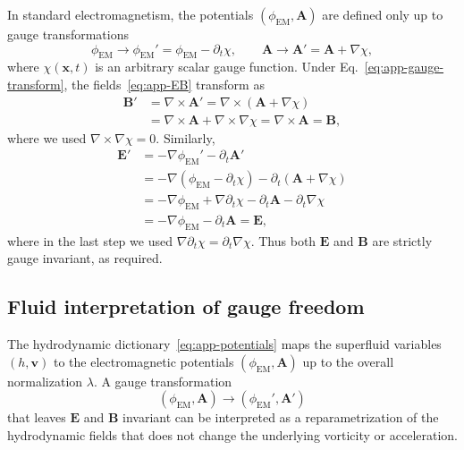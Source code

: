\documentclass[11pt]{article}
\begin{document}
In standard electromagnetism, the potentials $(\phi_{\mathrm{EM}},\mathbf{A})$ are defined only up to gauge transformations
\begin{equation}
\phi_{\mathrm{EM}} \rightarrow \phi_{\mathrm{EM}}' = \phi_{\mathrm{EM}} - \partial_t \chi,
\qquad
\mathbf{A} \rightarrow \mathbf{A}' = \mathbf{A} + \nabla \chi,
\label{eq:app-gauge-transform}
\end{equation}
where $\chi(\mathbf{x},t)$ is an arbitrary scalar gauge function.  Under Eq.~\eqref{eq:app-gauge-transform}, the fields~\eqref{eq:app-EB} transform as
\begin{align}
\mathbf{B}'
&= \nabla \times \mathbf{A}'
 = \nabla \times (\mathbf{A} + \nabla \chi)
\nonumber\\
&= \nabla \times \mathbf{A} + \nabla \times \nabla \chi
 = \nabla \times \mathbf{A}
 = \mathbf{B},
\end{align}
where we used $\nabla\times\nabla\chi = 0$.  Similarly,
\begin{align}
\mathbf{E}'
&= -\nabla \phi_{\mathrm{EM}}' - \partial_t \mathbf{A}'
\nonumber\\
&= -\nabla(\phi_{\mathrm{EM}} - \partial_t \chi)
   - \partial_t(\mathbf{A} + \nabla \chi)
\nonumber\\
&= -\nabla\phi_{\mathrm{EM}} + \nabla\partial_t \chi
   - \partial_t \mathbf{A} - \partial_t \nabla \chi
\nonumber\\
&= -\nabla\phi_{\mathrm{EM}} - \partial_t \mathbf{A}
 = \mathbf{E},
\end{align}
where in the last step we used $\nabla\partial_t\chi = \partial_t \nabla\chi$.  Thus both $\mathbf{E}$ and $\mathbf{B}$ are strictly gauge invariant, as required.

\subsection{Fluid interpretation of gauge freedom}

The hydrodynamic dictionary~\eqref{eq:app-potentials} maps the superfluid variables $(h,\mathbf{v})$ to the electromagnetic potentials $(\phi_{\mathrm{EM}},\mathbf{A})$ up to the overall normalization $\lambda$.  A gauge transformation
\begin{equation}
(\phi_{\mathrm{EM}},\mathbf{A}) \rightarrow (\phi_{\mathrm{EM}}',\mathbf{A}')
\end{equation}
that leaves $\mathbf{E}$ and $\mathbf{B}$ invariant can be interpreted as a reparametrization of the hydrodynamic fields that does not change the underlying vorticity or acceleration.
\end{document}
